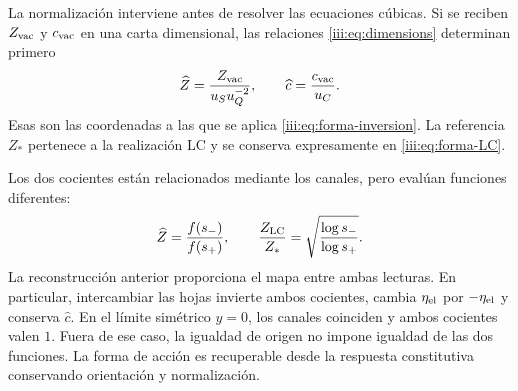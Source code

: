 La normalización interviene antes de resolver las ecuaciones cúbicas.
Si se reciben $Z_{\rm vac}$ y $c_{\rm vac}$ en una carta dimensional,
las relaciones \eqref{iii:eq:dimensions} determinan primero
\[
 \widehat Z=\frac{Z_{\rm vac}}{u_Su_Q^{-2}},\qquad
 \widehat c=\frac{c_{\rm vac}}{u_C}.
\]
Esas son las coordenadas a las que se aplica
\eqref{iii:eq:forma-inversion}. La referencia $Z_*$ pertenece a la
realización LC y se conserva expresamente en \eqref{iii:eq:forma-LC}.

Los dos cocientes están relacionados mediante los canales, pero evalúan
funciones diferentes:
\begin{equation}
 \widehat Z=\frac{f(s_-)}{f(s_+)},\qquad
 \frac{Z_{\rm LC}}{Z_*}
       =\sqrt{\frac{\log s_-}{\log s_+}}.
 \label{iii:eq:forma-dos-cocientes}
\end{equation}
La reconstrucción anterior proporciona el mapa entre ambas lecturas.
En particular, intercambiar las hojas invierte ambos cocientes, cambia
$\eta_{\rm el}$ por $-\eta_{\rm el}$ y conserva $\widehat c$.
En el límite simétrico $y=0$, los canales coinciden y ambos cocientes
valen $1$. Fuera de ese caso, la igualdad de origen no impone igualdad
de las dos funciones. La forma de acción es recuperable desde la
respuesta constitutiva conservando orientación y normalización.
